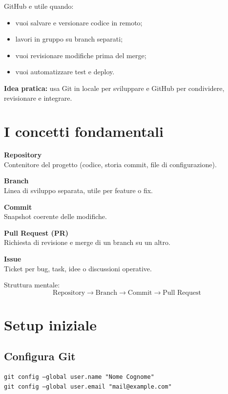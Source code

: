 \documentclass[a4paper,11pt]{article}
\begin{document}
GitHub e utile quando:
\begin{itemize}[leftmargin=1.2cm]
    \item vuoi salvare e versionare codice in remoto;
    \item lavori in gruppo su branch separati;
    \item vuoi revisionare modifiche prima del merge;
    \item vuoi automatizzare test e deploy.
\end{itemize}

\begin{tipbox}
\textbf{Idea pratica:} usa Git in locale per sviluppare e GitHub per condividere, revisionare e integrare.
\end{tipbox}

\section{I concetti fondamentali}
\begin{infobox}
\textbf{Repository} \\
Contenitore del progetto (codice, storia commit, file di configurazione).

\medskip
\textbf{Branch} \\
Linea di sviluppo separata, utile per feature o fix.

\medskip
\textbf{Commit} \\
Snapshot coerente delle modifiche.

\medskip
\textbf{Pull Request (PR)} \\
Richiesta di revisione e merge di un branch su un altro.

\medskip
\textbf{Issue} \\
Ticket per bug, task, idee o discussioni operative.
\end{infobox}

Struttura mentale:
\[
\text{Repository} \rightarrow \text{Branch} \rightarrow \text{Commit} \rightarrow \text{Pull Request}
\]

\section{Setup iniziale}
\subsection{Configura Git}
\begin{codebox}
\texttt{git config --global user.name "Nome Cognome"} \\
\texttt{git config --global user.email "mail@example.com"}
\end{codebox}
\end{document}
